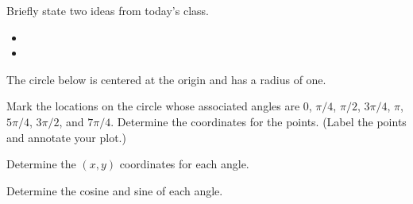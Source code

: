 \postClass

\begin{problem}
\item Briefly state two ideas from today's class.
  \begin{itemize}
  \item
  \item
  \end{itemize}
  \item The circle below is centered at the origin and has a radius of
    one.


    \begin{subproblem}
    \item Mark the locations on the circle whose associated angles are
      0, $\pi/4$, $\pi/2$, $3\pi/4$, $\pi$, $5\pi/4$, $3\pi/2$, and
      $7\pi/4$.
      Determine the coordinates for the points.
      (Label the points and annotate your plot.)
    \item Determine the $(x,y)$ coordinates for each angle.
    \item Determine the cosine and sine of each angle.
    \end{subproblem}
\end{problem}


